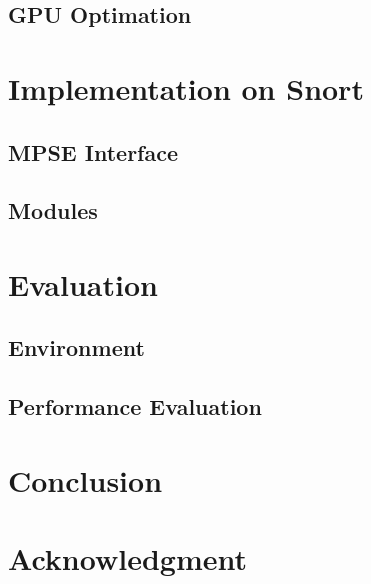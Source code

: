 \documentclass[conference]{IEEEtran}
\begin{document}
    \subsection{GPU Optimation}

\section{Implementation on Snort}
    \subsection{MPSE Interface}
    \subsection{Modules}

\section{Evaluation}
    \subsection{Environment}
    \subsection{Performance Evaluation}

\section{Conclusion}



\section{Acknowledgment}



\end{document}
